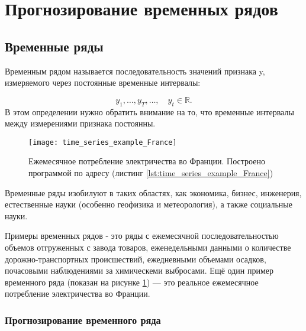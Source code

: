 \section{Прогнозирование временных рядов}

\subsection{Временные ряды}

Временным рядом называется последовательность значений признака y, измеряемого 
через постоянные временные интервалы:

\begin{equation*}
    y_1, \dots, y_T, \dots, \quad y_t \in \mathbb{R}.
\end{equation*}
В этом определении нужно обратить внимание на то, что временные интервалы между 
измерениями признака постоянны.\\[-0.5em]

\begin{figure}[h!]
    \centering
    \texttt{[image: time\_series\_example\_France]}
    \caption{Ежемесячное потребление электричества во Франции. Построено программой по адресу (листинг \ref{lst:time_series_example_France})}
    \label{fig:time_series_example_France}
\end{figure}

Временные ряды изобилуют в таких
областях, как экономика, бизнес, инженерия, естественные науки 
(особенно геофизика и метеорология), а также социальные науки.

Примеры временных рядов - это ряды с  
ежемесячной последовательностью объемов отгруженных с завода товаров, 
еженедельными данными о количестве дорожно-транспортных происшествий, 
ежедневными объемами осадков, почасовыми наблюдениями за химическеми 
выбросами. Ещё один пример временного ряда 
(показан на рисунке \ref{fig:time_series_example_France}) — это реальное 
ежемесячное потребление электричества во Франции.

\subsubsection{Прогнозирование временного ряда \cite{TSA_Box}}


